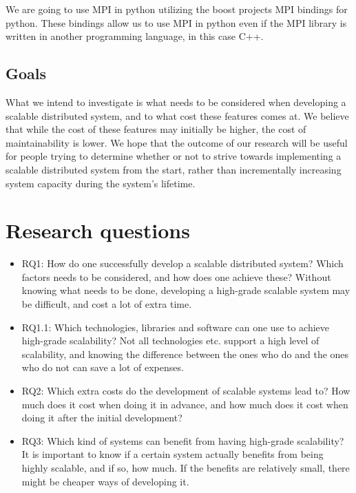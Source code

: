 \documentclass{article}
\begin{document}
{We are going to use MPI in python utilizing the boost projects MPI bindings
for python. These bindings allow us to use MPI in python even if the MPI library
is written in another programming language, in this case C++.
 
\subsection{Goals} 

What we intend to investigate is what needs to be considered
when developing a scalable distributed system, and to what cost these features
comes at. We believe that while the cost of these features may initially be
higher, the cost of maintainability is lower. We hope that the outcome of our
research will be useful for people trying to determine whether or not to strive
towards implementing a scalable distributed system from the start, rather than
incrementally increasing system capacity during the system's lifetime.

\newpage

\section{Research questions}

\begin{itemize}
\item{RQ1: How do one successfully develop a scalable distributed system? Which
factors needs to be considered, and how does one achieve these? Without knowing
what needs to be done, developing a high-grade scalable system may be
difficult, and cost a lot of extra time.} 

\item{RQ1.1: Which technologies, libraries and software can one use to achieve
high-grade scalability? Not all technologies etc. support a high level of
scalability, and knowing the difference between the ones who do and the ones
who do not can save a lot of expenses.}

\item{RQ2: Which extra costs do the development of scalable systems lead to?
How much does it cost when doing it in advance, and how much does it cost when
doing it after the initial development?} 

\item{RQ3: Which kind of systems can benefit from having high-grade scalability?
It is important to know if a certain system actually benefits from being highly
scalable, and if so, how much. If the benefits are relatively small, there 
might be cheaper ways of developing it.}



\end{itemize}}
\end{document}
